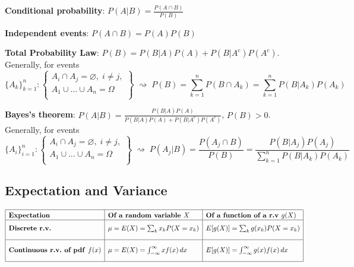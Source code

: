 \documentclass{article}
\newcommand{\Tr}[2]{#1}
\begin{document}
\textbf{\Tr{Conditional probability}{Betingad sannolikhet}}:
$P(A|B) = \frac{P(A\cap B)}{P(B)}$

\textbf{\Tr{Independent events}{Oberoende händelser}}: $P(A\cap B) = P(A)P(B)$

\medskip
\textbf{Total \Tr{Probability Law}{sannolikhet}}:
  $P(B) = P(B|A)P(A) + P(B|A^c)P(A^c)$.
  \Tr{Generally, for events}{Allmänt, för händelserna}
\[
  \bigl\{A_k\bigr\}_{k=1}^n:
  \left\{
  \begin{array}{l}
  A_i\cap A_j = \varnothing, \; i\neq j, \\
  A_1\cup \dots\cup A_n=\Omega \\
  \end{array}
\right\}
  \;\rightsquigarrow\;
P(B) = \sum_{k=1}^n P(B\cap A_k)
     = \sum_{k=1}^n P(B|A_k) P(A_k)
\]

\textbf{\Tr{Bayes's theorem}{Bayes formula}}: $
P(A|B) = \frac{P(B|A)P(A)}{P(B|A)P(A) + P(B|A^c)P(A^c)}
$, $P(B) > 0$. \/
\Tr{Generally, for events}{Allmänt, för händelserna}
\[
  \bigl\{A_i\bigr\}_{i=1}^n:
  \left\{
  \begin{array}{l}
  A_i\cap A_j = \varnothing, \; i\neq j, \\
  A_1\cup \dots\cup A_n=\Omega \\
  \end{array}
\right\}
  \;\rightsquigarrow\;
P(A_j|B) = \frac{P(A_j\cap B)}{P(B)}
      = \frac{P(B|A_j) P(A_j)}
             {\sum_{k=1}^n P(B|A_k) P(A_k)}
 \]%

\subsection*{\Tr{Expectation and Variance}{Väntevärde och varians}}%

\(
\begin{array}[m]{|l|l|l|}
\hline
\rule{0pt}{11pt}
\mbox{\textbf{\Tr{Expectation}{Väntevärde}}}
& \mbox{\textbf{\Tr{Of a random variable}{av en stokastisk variabel} }} X
& \mbox{\textbf{\Tr{Of a function of a r.v}{av en funktion av en s.v.} }} g(X) \cr
  \hline
  \rule{0pt}{15pt}
  \mbox{\textbf{\Tr{Discrete r.v.}{Diskret s.v.} }}
  & \mu=E(X) = \sum_k x_kP(X=x_k)
  &  E[g(X)] = \sum_k g(x_k)P(X=x_k)  \\[10pt]
  \hline
  \rule{0pt}{18pt}
  \mbox{\textbf{\Tr{Continuous r.v.~of}{Kontinuerlig s.v.~med} pdf }} f(x)
  & \mu=E(X) = \int_{-\infty}^\infty x f(x)\,dx
  & E[g(X)] = \int_{-\infty}^\infty g(x) f(x)\,dx \\[10pt]
  \hline
\end{array}
\)
\end{document}
